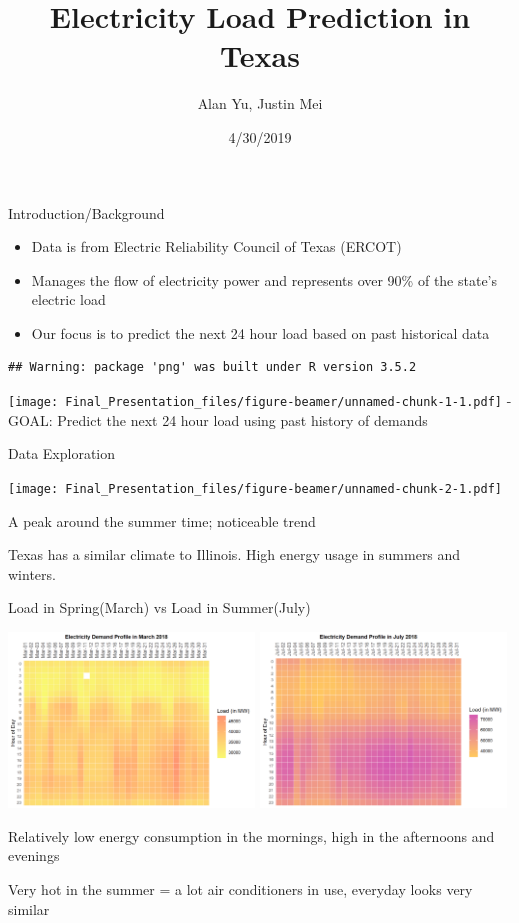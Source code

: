 \documentclass[ignorenonframetext,]{beamer}
\title{Electricity Load Prediction in Texas}
\author{Alan Yu, Justin Mei}
\date{4/30/2019}
\providecommand{\tightlist}{%
  \setlength{\itemsep}{0pt}\setlength{\parskip}{0pt}}
\begin{document}
\frame{\titlepage}

\begin{frame}[fragile]{Introduction/Background}

\begin{itemize}
\tightlist
\item
  Data is from Electric Reliability Council of Texas (ERCOT)
\item
  Manages the flow of electricity power and represents over 90\% of the
  state's electric load
\item
  Our focus is to predict the next 24 hour load based on past historical
  data
\end{itemize}

\begin{verbatim}
## Warning: package 'png' was built under R version 3.5.2
\end{verbatim}

\texttt{[image: Final\_Presentation\_files/figure-beamer/unnamed-chunk-1-1.pdf]}
- GOAL: Predict the next 24 hour load using past history of demands

\end{frame}

\begin{frame}{Data Exploration}

\texttt{[image: Final\_Presentation\_files/figure-beamer/unnamed-chunk-2-1.pdf]}

A peak around the summer time; noticeable trend

Texas has a similar climate to Illinois. High energy usage in summers
and winters.

\end{frame}

\begin{frame}{Load in Spring(March) vs Load in Summer(July)}

\includegraphics[width=0.49000\textwidth]{README-March HeatMap-1.png}
\includegraphics[width=0.49000\textwidth]{README-July HeatMap-1.png}

Relatively low energy consumption in the mornings, high in the
afternoons and evenings

Very hot in the summer = a lot air conditioners in use, everyday looks
very similar

\end{frame}
\end{document}
